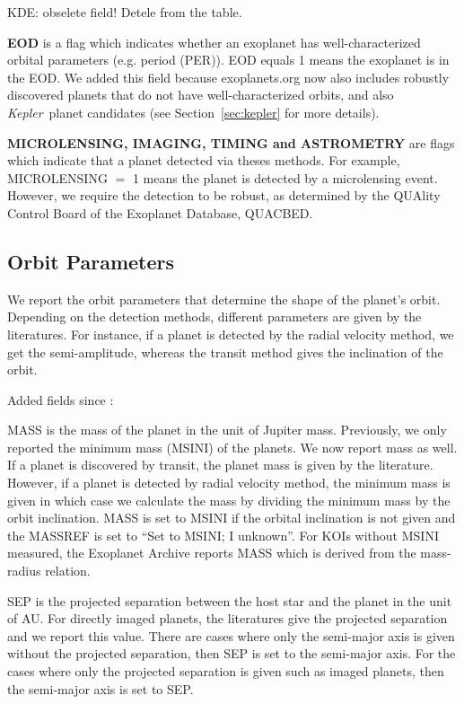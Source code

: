 \documentclass[11pt,preprint]{aastex}
\def\kepler{\textit{Kepler}}
\begin{document}
\begin{CJK*}{UTF8}{gbsn}
KDE: obselete field! Detele from the table.

{\bf EOD} is a flag which indicates whether an exoplanet has well-characterized orbital parameters (e.g. period (PER)). EOD equals 1 means the exoplanet is in the EOD. We added this field because exoplanets.org now also includes robustly discovered planets that do not have well-characterized orbits, and also \kepler\ planet candidates (see Section~\ref{sec:kepler} for more details).


{\bf MICROLENSING, IMAGING, TIMING and ASTROMETRY} are flags which indicate that a planet detected via theses methods. For example, MICROLENSING $=$ 1 means the planet is detected by a microlensing event. However, we require the detection to be robust, as determined by the QUAlity Control Board of the Exoplanet Database, QUACBED. 


\subsection{Orbit Parameters}
We report the orbit parameters that determine the shape of the planet's orbit. Depending on the detection methods, different parameters are given by the literatures. For instance, if a planet is detected by the radial velocity method, we get the semi-amplitude, whereas the transit method gives the inclination of the orbit. 

Added fields since \cite{Wright2011}:


MASS is the mass of the planet in the unit of Jupiter mass. Previously, we only reported the minimum mass (MSINI) of the planets. We now report mass as well. If a planet is discovered by transit, the planet mass is given by the literature. However, if a planet is detected by radial velocity
method, the minimum mass is given in which case we calculate the mass
by dividing the minimum mass by the orbit inclination. MASS is set to
MSINI if the orbital inclination is not given and the MASSREF is set
to ``Set to MSINI; I unknown''. For KOIs without MSINI measured, the Exoplanet Archive reports MASS which is derived from the mass-radius relation. 


SEP is the projected separation between the host star and the planet in the unit of AU. For directly imaged planets, the literatures give the projected separation and we report this value. There are cases where only the semi-major axis is given without the projected separation, then SEP is set to the semi-major axis. For the cases where only the projected separation is given such as imaged planets, then the semi-major axis is set to SEP. 


\end{CJK*}
\end{document}

